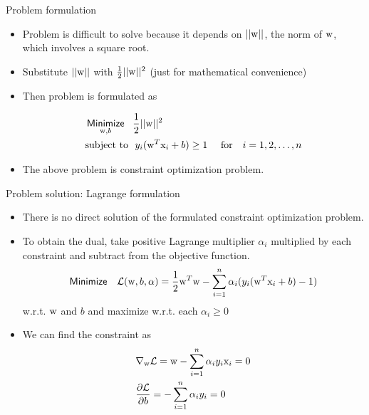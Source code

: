 \begin{frame}{Problem formulation}
\begin{itemize}

\item Problem is difficult to solve because it depends on $||{\rm w}||$, the norm of ${\rm w}$, which involves a square root.
\item Substitute $||{\rm w}||$ with $\frac{1}{2}||{\rm w}||^2$ (just for mathematical convenience)
\item Then problem is formulated as

\begin{align*}
&\mathop{\sf Minimize}\limits_{{\rm w},b}~~\frac{1}{2}||{\rm w}||^2\\
&\text{subject to}~~y_i( {{{\rm w}^T}{{\rm x}_i} + b} ) \geq 1~~~~\text{for}~~~i=1,2,\ldots,n
\end{align*}
\item The above problem is {\color{mycolor1}constraint optimization problem}.
\end{itemize}
\end{frame}


\begin{frame}{Problem solution: Lagrange formulation}
\begin{itemize}
\item There is {\color{mycolor2}no direct solution} of the formulated constraint optimization problem.
\item To obtain the dual, take positive Lagrange multiplier $\alpha_i$ multiplied by each constraint and subtract from the objective function.
\[{\sf Minimize}~~~\mathcal{L}({\rm w},b,\alpha)=\frac{1}{2}{\rm w}^T{\rm w} -\sum_{i=1}^{n} \alpha_i (y_i({\rm w}^T{\rm x}_i+b)-1)\]
w.r.t. ${\rm w}$ and $b$ and maximize w.r.t. each $\alpha_{i}\geq 0$
\item We can find the constraint as
\[\begin{gathered}
  {\nabla _{\rm w}}\mathcal{L} = {\rm w} - \sum\limits_{i = 1}^n {{\alpha _i}{y_i}{{\rm x}_i} = 0}  \hfill \\
  \frac{{\partial \mathcal{L}}}{{\partial b}} =  - \sum\limits_{i = 1}^n {{\alpha _i}{y_i} = 0}  \hfill \\ 
\end{gathered} \]
\end{itemize}
\end{frame}

